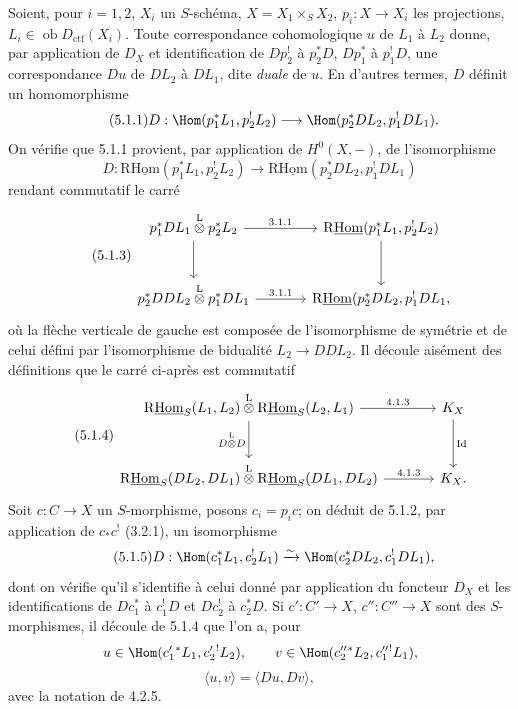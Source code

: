 Soient, pour $i=1,2$, $X_i$ un $S$-schéma, $X=X_1\times_S X_2$, $p_i:X\to X_i$ les projections, $L_i\in\operatorname{ob}D_{\mathrm{ctf}}(X_i)$. Toute correspondance cohomologique $u$ de $L_1$ à $L_2$ donne, par application de $D_X$ et identification de $Dp_2^!$ à $p_2^*D$, $Dp_1^*$ à $p_1^!D$, une correspondance $Du$ de $DL_2$ à $DL_1$, dite \emph{duale} de $u$. En d'autres termes, $D$ définit un homomorphisme
\begin{equation}
\tag{5.1.1}
D:\Hom(p_1^*L_1,p_2^!L_2)\longrightarrow \Hom(p_2^*DL_2,p_1^!DL_1).
\end{equation}
On vérifie que 5.1.1 provient, par application de $H^0(X,-)$, de l'isomorphisme
\begin{equation}
\tag{5.1.2}
D:\mathrm{R}\underline{\mathrm{Hom}}(p_1^*L_1,p_2^!L_2)\longrightarrow\mathrm{R}\underline{\mathrm{Hom}}(p_2^*DL_2,p_1^!DL_1)
\end{equation}
rendant commutatif le carré
\begin{equation}
\tag{5.1.3}
\begin{tikzcd}[column sep=large,row sep=large]
p_1^*DL_1\overset{\mathrm{L}}{\otimes}p_2^*L_2 \arrow[r,"3.1.1"] \arrow[d]
& \mathrm{R}\underline{\mathrm{Hom}}(p_1^*L_1,p_2^!L_2) \arrow[d] \\
p_2^*DDL_2\overset{\mathrm{L}}{\otimes}p_1^*DL_1 \arrow[r,"3.1.1"]
& \mathrm{R}\underline{\mathrm{Hom}}(p_2^*DL_2,p_1^!DL_1,
\end{tikzcd}
\end{equation}
où la flèche verticale de gauche est composée de l'isomorphisme de symétrie et de celui défini par l'isomorphisme de bidualité $L_2\to DDL_2$. Il découle aisément des définitions que le carré ci-après est commutatif
\begin{equation}
\tag{5.1.4}
\begin{tikzcd}[column sep=large,row sep=large]
\mathrm{R}\underline{\mathrm{Hom}}_S(L_1,L_2)\overset{\mathrm{L}}{\otimes}\mathrm{R}\underline{\mathrm{Hom}}_S(L_2,L_1) \arrow[r,"4.1.3"] \arrow[d,"D\overset{\mathrm{L}}{\otimes} D"']
& K_X \arrow[d,"\operatorname{Id}"] \\
\mathrm{R}\underline{\mathrm{Hom}}_S(DL_2,DL_1)\overset{\mathrm{L}}{\otimes}\mathrm{R}\underline{\mathrm{Hom}}_S(DL_1,DL_2) \arrow[r,"4.1.3"]
& K_X.
\end{tikzcd}
\end{equation}
Soit $c:C\to X$ un $S$-morphisme, posons $c_i=p_ic$; on déduit de 5.1.2, par application de $c_*c^!$ (3.2.1), un isomorphisme
\begin{equation}
\tag{5.1.5}
D:\Hom(c_1^*L_1,c_2^!L_1)\xrightarrow{\sim}\Hom(c_2^*DL_2,c_1^!DL_1),
\end{equation}
dont on vérifie qu'il s'identifie à celui donné par application du foncteur $D_X$ et 
les
identifications de $Dc_1^*$ à $c_1^!D$ et $Dc_2^!$ à $c_2^*D$. Si $c':C'\to X$, $c'':C''\to X$ sont des $S$-morphismes, il découle de 5.1.4 que l'on a, pour
\[
u\in\Hom(c_1'{}^*L_1,c_2'{}^!L_2),\qquad v\in\Hom(c_2''{}^*L_2,c_1''{}^!L_1),\]
\begin{equation}
\tag{5.1.6}
\langle u,v\rangle=\langle Du,Dv\rangle,
\end{equation}
avec la notation de 4.2.5.

